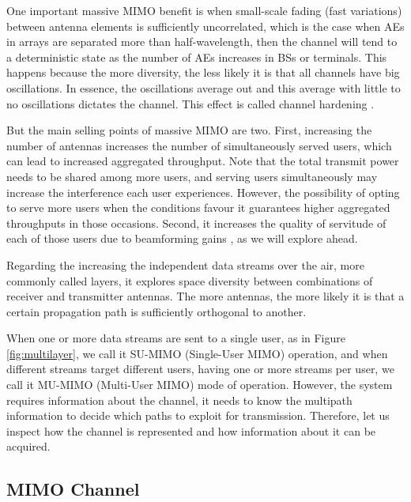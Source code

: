 One important massive MIMO benefit is when small-scale fading (fast variations) between antenna elements is sufficiently uncorrelated, which is the case when AEs in arrays are separated more than half-wavelength, then the channel will tend to a deterministic state as the number of AEs increases in BSs or terminals. This happens because the more diversity, the less likely it is that all channels have big oscillations. In essence, the oscillations average out and this average with little to no oscillations dictates the channel. This effect is called channel hardening \cite{1327795}.

But the main selling points of massive MIMO are two. First, increasing the number of antennas increases the number of simultaneously served users, which can lead to increased aggregated throughput. Note that the total transmit power needs to be shared among more users, and serving users simultaneously may increase the interference each user experiences. However, the possibility of opting to serve more users when the conditions favour it guarantees higher aggregated throughputs in those occasions. Second, it increases the quality of servitude of each of those users due to beamforming gains \cite{7500452}, as we will explore ahead. 

Regarding the increasing the independent data streams over the air, more commonly called layers, it explores space diversity between combinations of receiver and transmitter antennas. The more antennas, the more likely it is that a certain propagation path is sufficiently orthogonal to another.

When one or more data streams are sent to a single user, as in Figure \ref{fig:multilayer}, we call it SU-MIMO (Single-User MIMO) operation, and when different streams target different users, having one or more streams per user, we call it MU-MIMO (Multi-User MIMO) mode of operation. However, the system requires information about the channel, it needs to know the multipath information to decide which paths to exploit for transmission. Therefore, let us inspect how the channel is represented and how information about it can be acquired.



\subsection*{MIMO Channel}

